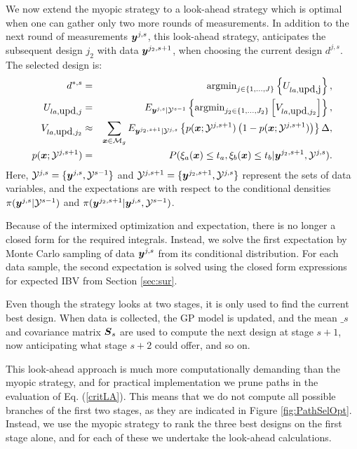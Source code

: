 \documentclass[aoas]{imsart}
\begin{document}
We now extend the myopic strategy to a look-ahead strategy which is
optimal when one can gather only two more rounds of measurements. In
addition to the next round of measurements ${\boldsymbol y}^{j,s}$, this
look-ahead strategy, anticipates the subsequent design $j_2$ with
data ${\boldsymbol y}^{j_2,s+1}$, when choosing the current design $d^{j,s}$.  The
selected design is:
\begin{eqnarray}\label{critLA}
    d^{*,s} &=& \mbox{argmin}_{j \in \{1,\ldots,J\}} \left\{ U_{la,\mbox{upd,j}} \right\},  \\
    U_{la,\mbox{upd},j} & = &  E_{\by^{j,s}|\mathcal{Y}^{s-1}} \left\{ \mbox{argmin}_{j_2 \in \{1,\ldots,{J}_2\}} \left[ V_{la,\mbox{upd},j_2} \right] \right\}, \nonumber \\
V_{la,\mbox{upd},j_2} & \approx & \sum_{\bx \in \mathcal{M}_g} E_{\by^{j_2,s+1}|\mathcal{Y}^{j,s}} \left\{ p(\bx;\mathcal{Y}^{j,s+1})\left( 1-p(\bx;\mathcal{Y}^{j,s+1})\right) \right\} \Delta, \nonumber \\
    p(\bx;\mathcal{Y}^{j,s+1}) &=& P(\xi_a(\bx) \leq t_a, \xi_b(\bx) \leq t_b |\by^{j_2,s+1},\mathcal{Y}^{j,s}). \nonumber
\end{eqnarray}
Here, $\mathcal{Y}^{j,s}=\{{\boldsymbol y}^{j,s},\mathcal{Y}^{s-1}\}$ and
$\mathcal{Y}^{j,s+1}=\{{\boldsymbol y}^{j_2,s+1},\mathcal{Y}^{j,s}\}$ represent
the sets of data variables, and the expectations are with respect to
the conditional densities $\pi({\boldsymbol y}^{j,s}|\mathcal{Y}^{s-1})$ and
$\pi({\boldsymbol y}^{j_2,s+1}|{\boldsymbol y}^{j,s},\mathcal{Y}^{s-1})$.

Because of the intermixed optimization and expectation, there is no
longer a closed form for the required integrals. Instead, we solve the
first expectation by Monte Carlo sampling of data ${\boldsymbol y}^{j,s}$ from its
conditional distribution. For each data sample, the second expectation
is solved using the closed form expressions for expected IBV from
Section \ref{sec:sur}.

Even though the strategy looks at two stages, it is only used to find
the current best design. When data is collected, the GP model is
updated, and the mean $\bm_{s}$ and covariance matrix ${\boldsymbol S}_{s}$ are
used to compute the next design at stage $s+1$, now anticipating what
stage $s+2$ could offer, and so on.

This look-ahead approach is much more computationally demanding than
the myopic strategy, and for practical implementation we prune paths
in the evaluation of Eq. (\ref{critLA}). This means that we do not
compute all possible branches of the first two stages, as they are
indicated in Figure \ref{fig:PathSelOpt}. Instead, we use the myopic
strategy to rank the three best designs on the first stage alone, and
for each of these we undertake the look-ahead calculations.
\end{document}
